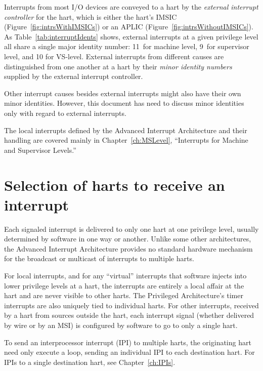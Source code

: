 Interrupts from most I/O devices are conveyed to a hart by the
\emph{external interrupt controller} for the hart, which is either the
hart's IMSIC (Figure~\ref{fig:intrsWithIMSICs}) or an APLIC
(Figure~\ref{fig:intrsWithoutIMSICs}).
As Table~\ref{tab:interruptIdents} shows, external interrupts
at a given privilege level all share a single major identity
number:  11~for machine level, 9~for supervisor level, and 10 for
\mbox{VS-level}.
External interrupts from different causes are distinguished from one
another at a hart by their \emph{minor identity numbers} supplied by
the external interrupt controller.

Other interrupt causes besides external interrupts might also have
their own minor identities.
However, this document has need to discuss minor identities only with
regard to external interrupts.

The local interrupts defined by the Advanced Interrupt Architecture
and their handling are covered mainly in Chapter~\ref{ch:MSLevel},
``Interrupts for Machine and Supervisor Levels.''

\section{Selection of harts to receive an interrupt}

Each signaled interrupt is delivered to only one hart at one privilege
level, usually determined by software in one way or another.
Unlike some other architectures, the {\RISCV} Advanced Interrupt
Architecture provides no standard hardware mechanism for the broadcast
or multicast of interrupts to multiple harts.

For local interrupts, and for any ``virtual'' interrupts that software
injects into lower privilege levels at a hart, the interrupts are
entirely a local affair at the hart and are never visible to other
harts.
The {\RISCV} Privileged Architecture's timer interrupts are also
uniquely tied to individual harts.
For other interrupts, received by a hart from sources outside the
hart, each interrupt signal (whether delivered by wire or by an MSI) is
configured by software to go to only a single hart.

To send an interprocessor interrupt (IPI) to multiple harts, the
originating hart need only execute a loop, sending an individual IPI to
each destination hart.
For IPIs to a single destination hart, see Chapter~\ref{ch:IPIs}.

